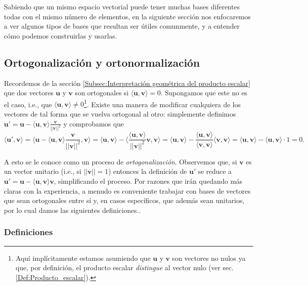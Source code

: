 \documentclass[12pt,dvipsnames]{article}
\begin{document}
Sabiendo que un mismo espacio vectorial puede tener muchas bases diferentes \textemdash todas con el mismo número de elementos\textemdash \hspace{1mm}, en la siguiente sección nos enfocaremos a ver algunos tipos de bases que resultan ser útiles comunmente, y a entender cómo podemos construirlas y usarlas.

\newpage
\subsection{Ortogonalización y ortonormalización} \label{Subsec:Ortogonalización y ortonormalización}

Recordemos de la sección \ref{Subsec:Interpretación geométrica del producto escalar} que dos vectores $\mathbf{u}$ y $\mathbf{v}$ son ortogonales si $\langle\mathbf{u},\mathbf{v}\rangle=0$. Supongamos que este no es el caso, i.e., que $\langle\mathbf{u},\mathbf{v}\rangle\neq 0$\footnote{Aquí implícitamente estamos asumiendo que $\mathbf{u}$ y $\mathbf{v}$ son vectores no nulos ya que, por definición, el producto escalar \emph{distingue} al vector nulo (ver sec. \ref{Def:Producto_escalar}).}. Existe una manera de modificar cualquiera de los vectores de tal forma que se vuelva ortogonal al otro: simplemente definimos $\mathbf{u'}=\mathbf{u}-\langle\mathbf{u},\mathbf{v}\rangle\frac{\mathbf{v}}{||\mathbf{v}||^2}$ y comprobamos que $$\langle\mathbf{u'},\mathbf{v}\rangle=\big\langle\mathbf{u}-\langle\mathbf{u},\mathbf{v}\rangle\frac{\mathbf{v}}{||\mathbf{v}||^2},\mathbf{v}\big\rangle=\langle\mathbf{u},\mathbf{v}\rangle-\big\langle\frac{\langle\mathbf{u},\mathbf{v}\rangle}{||\mathbf{v}||^2}\mathbf{v},\mathbf{v}\big\rangle=\langle\mathbf{u},\mathbf{v}\rangle-\frac{\langle\mathbf{u},\mathbf{v}\rangle}{\langle\mathbf{v},\mathbf{v}\rangle}\langle\mathbf{v},\mathbf{v}\rangle=\langle\mathbf{u},\mathbf{v}\rangle-\langle\mathbf{u},\mathbf{v}\rangle\cdot 1=0.$$ 

A esto se le conoce como un proceso de \emph{ortogonalización}. Observemos que, si $\mathbf{v}$ es un vector unitario (i.e., si $||\mathbf{v}||=1$) entonces la definición de $\mathbf{u'}$ se reduce a $\mathbf{u'}=\mathbf{u}-\langle\mathbf{u},\mathbf{v}\rangle\mathbf{v}$, simplificando el proceso. Por razones que irán quedando más claras con la experiencia, a menudo es conveniente trabajar con bases de vectores que sean ortogonales entre sí y, en casos específicos, que además sean unitarios, por lo cual damos las siguientes definiciones..

\subsubsection{Definiciones}
\end{document}
